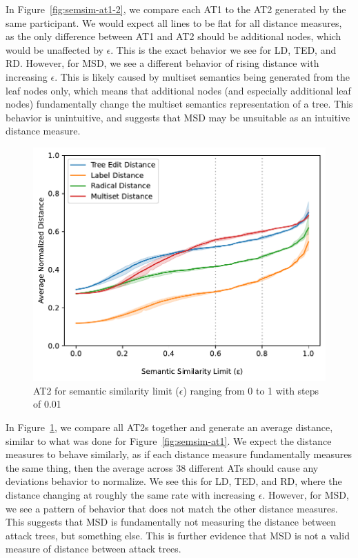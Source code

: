 In Figure~\ref{fig:semsim-at1-2}, we compare each AT1 to the AT2 generated by the same participant. We would expect all lines to be flat for all distance measures, as the only difference between AT1 and AT2 should be additional nodes, which would be unaffected by $\epsilon$. This is the exact behavior we see for LD, TED, and RD. However, for MSD, we see a different behavior of rising distance with increasing $\epsilon$. This is likely caused by multiset semantics being generated from the leaf nodes only, which means that additional nodes (and especially additional leaf nodes) fundamentally change the multiset semantics representation of a tree. This behavior is unintuitive, and suggests that MSD may be unsuitable as an intuitive distance measure.


\begin{figure}
\includegraphics[width=\linewidth]{code/img/similaritylimits_at2_percentage.pdf}
\caption{AT2 for semantic similarity limit ($\epsilon$) ranging from 0 to 1 with steps of 0.01}
\label{fig:semsim-at2}
\end{figure}


In Figure~\ref{fig:semsim-at2}, we compare all AT2s together and generate an average distance, similar to what was done for Figure~\ref{fig:semsim-at1}. We expect the distance measures to behave similarly, as if each distance measure fundamentally measures the same thing, then the average across 38 different ATs should cause any deviations behavior to normalize. We see this for LD, TED, and RD, where the distance changing at roughly the same rate with increasing $\epsilon$. However, for MSD, we see a pattern of behavior that does not match the other distance measures. This suggests that MSD is fundamentally not measuring the distance between attack trees, but something else. This is further evidence that MSD is not a valid measure of distance between attack trees.


